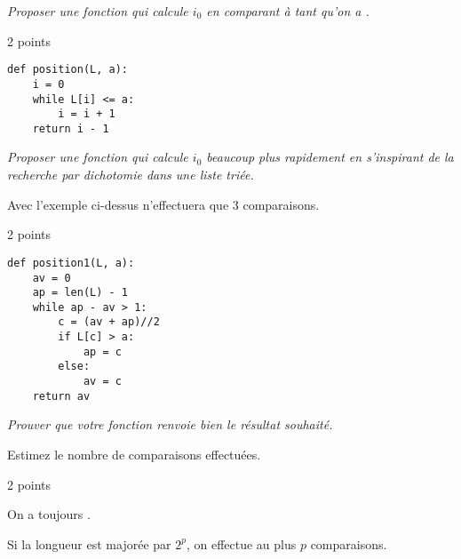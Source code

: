 \begin{Exercise}\it
Proposer une fonction  qui calcule $i_0$ en comparant  à  tant qu'on a .
\end{Exercise}
\begin{Answer}2 points
\begin{lstlisting}
def position(L, a):
    i = 0
    while L[i] <= a:
        i = i + 1
    return i - 1
\end{lstlisting}
\end{Answer}
\begin{Exercise}\it
Proposer une fonction  qui calcule $i_0$ beaucoup plus rapidement en s'inspirant de la recherche par dichotomie dans une liste triée.

Avec l'exemple ci-dessus  n'effectuera que 3 comparaisons.
\end{Exercise}
\begin{Answer}2 points
\begin{lstlisting}
def position1(L, a):
    av = 0
    ap = len(L) - 1
    while ap - av > 1:
        c = (av + ap)//2
        if L[c] > a:
            ap = c
        else:
            av = c
    return av

\end{lstlisting}
\end{Answer}
\begin{Exercise}\it
Prouver que votre fonction  renvoie bien le résultat souhaité.

Estimez le nombre de comparaisons effectuées.
\end{Exercise}
\begin{Answer}2 points

On a toujours .

Si la longueur est majorée par $2^p$, on effectue au plus $p$ comparaisons.
\end{Answer}




